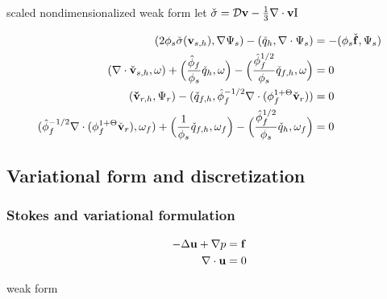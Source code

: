 scaled nondimensionalized weak form
let $\check{\sigma} = \mathcal{D}\bold{v} - \frac{1}{3}\nabla \cdot \bold{v} \bold{\text{I}}$

\begin{equation}
		  \begin{aligned}
					 (2\phi_s\check{\sigma}(\bold{v}_{s,h}),\nabla \Psi_s) - (\check{q}_h, \nabla \cdot \Psi_s) &= -(\phi_s\check{\bold{f}}, \Psi_s) \\
					 (\nabla \cdot \check{\bold{v}}_{s,h}, \omega)  + \Big(\frac{\hat{\phi}_f}{\phi_s} \check{q}_h, \omega\Big) - 
					\Big(\frac{\hat{\phi}_f^{1/2}}{\phi_s} \check{q}_{f,h},\omega \Big) &= 0\\
					 (\bold{\check{v}}_{r,h},\Psi_r)  - (\check{q}_{f,h},\hat{\phi}_f^{-1/2} \nabla \cdot (\phi_f^{1+\Theta}\check{\bold{v}}_r)) &= 0\\
					 (\hat{\phi}_f^{-1/2} \nabla \cdot (\phi_f^{1+\Theta}\check{\bold{v}}_r),\omega_f) + \Big(\frac{1}{\phi_s}\check{q}_{f,h},\omega_f \Big) - \Big( \frac{\hat{\phi}_f^{1/2}}{\phi_s} \check{q}_h, \omega_f \Big) &= 0
		  \end{aligned}
\end{equation}

\newpage

\subsection{Variational form and discretization}

\subsubsection{Stokes and variational formulation}
\begin{equation}
\begin{aligned}
-\Delta \bold{u} + \nabla p &= \bold{f} \\
\nabla \cdot \bold{u} &= 0
\end{aligned}
\end{equation}

weak form


